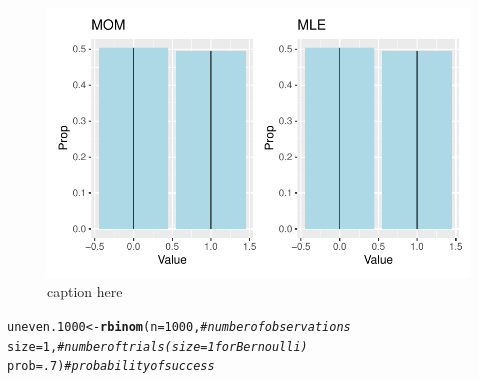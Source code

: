 \documentclass{article}\usepackage[]{graphicx}\usepackage[]{color}
\makeatletter
\def\maxwidth{ %
  \ifdim\Gin@nat@width>\linewidth
    \linewidth
  \else
    \Gin@nat@width
  \fi
}
\newcommand{\hlnum}[1]{\textcolor[rgb]{0.686,0.059,0.569}{#1}}%
\newcommand{\hlcom}[1]{\textcolor[rgb]{0.678,0.584,0.686}{\textit{#1}}}%
\newcommand{\hlstd}[1]{\textcolor[rgb]{0.345,0.345,0.345}{#1}}%
\newcommand{\hlkwb}[1]{\textcolor[rgb]{0.69,0.353,0.396}{#1}}%
\newcommand{\hlkwc}[1]{\textcolor[rgb]{0.333,0.667,0.333}{#1}}%
\newcommand{\hlkwd}[1]{\textcolor[rgb]{0.737,0.353,0.396}{\textbf{#1}}}%
\newenvironment{kframe}{%
 \def\at@end@of@kframe{}%
 \ifinner\ifhmode%
  \def\at@end@of@kframe{\end{minipage}}%
  \begin{minipage}{\columnwidth}%
 \fi\fi%
 \def\FrameCommand##1{\hskip\@totalleftmargin \hskip-\fboxsep
 \colorbox{shadecolor}{##1}\hskip-\fboxsep
     \hskip-\linewidth \hskip-\@totalleftmargin \hskip\columnwidth}%
 \MakeFramed {\advance\hsize-\width
   \@totalleftmargin\z@ \linewidth\hsize
   \@setminipage}}%
 {\par\unskip\endMakeFramed%
 \at@end@of@kframe}
\newenvironment{knitrout}{}{} %
\makeatother
\begin{document}
\begin{enumerate}
\begin{enumerate}
\begin{figure}[H]
\begin{center}
\begin{knitrout}
\color{fgcolor}
\includegraphics[width=\maxwidth]{figure/unnamed-chunk-16-1} 
\end{knitrout}
\caption{caption here}
\label{p4plot7}%
\end{center}
\end{figure}


\begin{knitrout}
\color{fgcolor}\begin{kframe}
\begin{alltt}
\hlstd{uneven.1000} \hlkwb{<-} \hlkwd{rbinom}\hlstd{(}\hlkwc{n}\hlstd{=}\hlnum{1000}\hlstd{,}        \hlcom{#number of observations}
                    \hlkwc{size}\hlstd{=}\hlnum{1}\hlstd{,}        \hlcom{#number of trials (size=1 for Bernoulli)}
                    \hlkwc{prob}\hlstd{=}\hlnum{.7}\hlstd{)}       \hlcom{#probability of success}


\end{alltt}
\end{kframe}
\end{knitrout}
\end{enumerate}
\end{enumerate}
\end{document}
